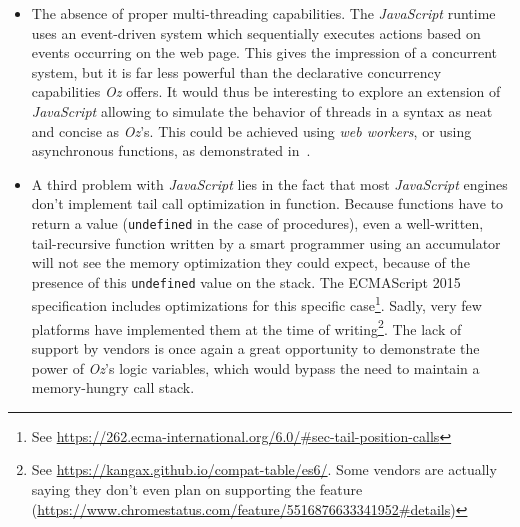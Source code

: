 \begin{itemize}
    This is a nice approach, but it still can be confusing for the programmer, as it isn't very intuitive : if I am not allowed to access the variable, why could I declare it after its access in the first place ?
    \textit{Oz} provides a much more elegant approach, with the concept of \textit{unbound values} (see Figure~\ref{fig:oz-unbound}).
    Any function that needs to access such a value will wait until it is available, which allows creating data-driven operations (\textit{dataflow execution}).
    This is a fundamentally different approach to this problem, but one that is probably worth exploring in an extension of \textit{JavaScript}, notably by using its asynchronous capabilities\cite{ozjs}.
    \begin{figure}
        \begin{lstlisting}[language=oz]
        local
            A % Equivalent to A = _
        in
            {Browse {PerformComputation 5 1 A}}
            % The function holds until A gets a value
            % A is still unbound
            A = 1 % The function can get evaluated
        end
        \end{lstlisting}
        \caption{Unbound values in \textit{Oz}}
        \label{fig:oz-unbound}
    \end{figure}
    \item The absence of proper multi-threading capabilities.
    The \textit{JavaScript} runtime uses an event-driven system which sequentially executes actions based on events occurring on the web page.
    This gives the impression of a concurrent system, but it is far less powerful than the declarative concurrency capabilities \textit{Oz} offers.
    It would thus be interesting to explore an extension of \textit{JavaScript} allowing to simulate the behavior of threads in a syntax as neat and concise as \textit{Oz}'s.
    This could be achieved using \textit{web workers}, or using asynchronous functions, as demonstrated in~\cite{ozjs}.
    \item A third problem with \textit{JavaScript} lies in the fact that most \textit{JavaScript} engines don't implement tail call optimization in function.
    Because functions have to return a value (\texttt{undefined} in the case of procedures), even a well-written, tail-recursive function written by a smart programmer using an accumulator will not see the memory optimization they could expect, because of the presence of this \texttt{undefined} value on the stack.
    The ECMAScript 2015 specification includes optimizations for this specific case\footnote{See \url{https://262.ecma-international.org/6.0/\#sec-tail-position-calls}}.
    Sadly, very few platforms have implemented them at the time of writing\footnote{See \url{https://kangax.github.io/compat-table/es6/}. Some vendors are actually saying they don't even plan on supporting the feature (\url{https://www.chromestatus.com/feature/5516876633341952\#details})}.
    The lack of support by vendors is once again a great opportunity to demonstrate the power of \textit{Oz}'s logic variables, which would bypass the need to maintain a memory-hungry call stack.
\end{itemize}
